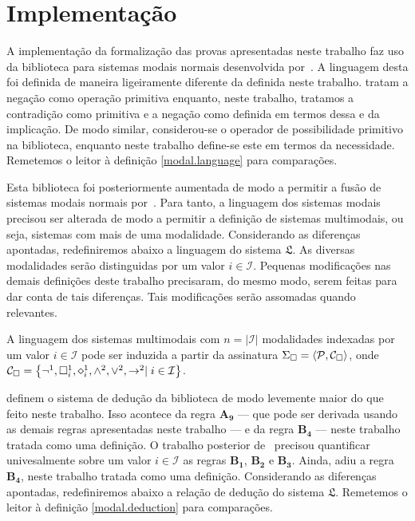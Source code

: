 \chapter{Implementação} 

A implementação da formalização das provas apresentadas neste trabalho faz uso da biblioteca para sistemas modais normais desenvolvida por~\cite{Silveira}.
A linguagem desta foi definida de maneira ligeiramente diferente da definida neste trabalho.
\cite{Silveira} tratam a negação como operação primitiva enquanto, neste trabalho, tratamos a contradição como primitiva e a negação como definida em termos dessa e da implicação.
De modo similar, considerou-se o operador de possibilidade primitivo na biblioteca, enquanto neste trabalho define-se este em termos da necessidade.
Remetemos o leitor à definição \ref{modal.language} para comparações.

\vspace{.3\baselineskip}
Esta biblioteca foi posteriormente aumentada de modo a permitir a fusão de sistemas modais normais por~\cite{Nunes}.
Para tanto, a linguagem dos sistemas modais precisou ser alterada de modo a permitir a definição de sistemas multimodais, ou seja, sistemas com mais de uma modalidade.
Considerando as diferenças apontadas, redefiniremos abaixo a linguagem do sistema $\mathfrak{L}$.
As diversas modalidades serão distinguidas por um valor $i\in\mathcal{I}$.
Pequenas modificações nas demais definições deste trabalho precisaram, do mesmo modo, serem feitas para dar conta de tais diferenças.
Tais modificações serão assomadas quando relevantes.

\vspace{.5\baselineskip}
\begin{tcolorbox}[enhanced jigsaw, breakable, sharp corners, colframe=black, colback=white, boxrule=0.5pt, left=1.5mm, right=1.5mm, top=1.5mm, bottom=1.5mm]
\begin{definition}
    A linguagem dos sistemas multimodais com $n=|\mathcal{I}|$ modalidades indexadas por um valor $i\in\mathcal{I}$ pode ser induzida a partir da assinatura $\Sigma_{\Box}=\langle\mathcal{P},\mathcal{C}_{\Box}\rangle$, onde $\mathcal{C}_{\nec}=\set{\neg^1,\nec^1_i,\pos^1_i,\wedge^2,\vee^2,\to^2\mid i\in\mathcal{I}}$.
\end{definition}
\end{tcolorbox}

\vspace{.5\baselineskip}
\cite{Silveira} definem o sistema de dedução da biblioteca de modo levemente maior do que feito neste trabalho.
Isso acontece da regra $\mathbf{A_9}$ --- que pode ser derivada usando as demais regras apresentadas neste trabalho --- e da regra $\mathbf{B_4}$ --- neste trabalho tratada como uma definição.
O trabalho posterior de~\cite{Nunes} precisou quantificar univesalmente sobre um valor $i\in\mathcal{I}$ as regras $\mathbf{B_1}$, $\mathbf{B_2}$ e $\mathbf{B_3}$.
Ainda, adiu a regra $\mathbf{B_4}$, neste trabalho tratada como uma definição.
Considerando as diferenças apontadas, redefiniremos abaixo a relação de dedução do sistema $\mathfrak{L}$.
Remetemos o leitor à definição \ref{modal.deduction} para comparações.

